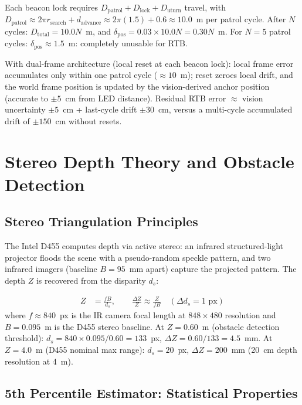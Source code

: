 \begin{eqblock}
Each beacon lock requires $D_{\text{patrol}} + D_{\text{lock}} + D_{\text{uturn}}$ travel, with $D_{\text{patrol}} \approx 2\pi r_{\text{search}} + d_{\text{advance}} \approx 2\pi(1.5) + 0.6 \approx 10.0$~m per patrol cycle. After $N$ cycles: $D_{\text{total}} = 10.0N$~m, and $\delta_{\text{pos}} = 0.03 \times 10.0N = 0.30N$~m. For $N=5$ patrol cycles: $\delta_{\text{pos}} \approx 1.5$~m: completely unusable for RTB.

With dual-frame architecture (local reset at each beacon lock): local frame error accumulates only within one patrol cycle ($\approx10$~m); reset zeroes local drift, and the world frame position is updated by the vision-derived anchor position (accurate to $\pm5$~cm from LED distance). Residual RTB error $\approx$ vision uncertainty $\pm5$~cm + last-cycle drift $\pm30$~cm, versus a multi-cycle accumulated drift of $\pm150$~cm without resets.
\end{eqblock}

\section{Stereo Depth Theory and Obstacle Detection}

\subsection{Stereo Triangulation Principles}

The Intel D455 computes depth via active stereo: an infrared structured-light projector floods the scene with a pseudo-random speckle pattern, and two infrared imagers (baseline $B=95$~mm apart) capture the projected pattern. The depth $Z$ is recovered from the disparity $d_s$:

\begin{eqblock}
\begin{align}
Z &= \frac{fB}{d_s}, \qquad \frac{\Delta Z}{Z} \approx \frac{Z}{fB}\quad(\Delta d_s = 1\text{ px})
\end{align}
where $f\approx840$~px is the IR camera focal length at $848\times480$ resolution and $B=0.095$~m is the D455 stereo baseline. At $Z=0.60$~m (obstacle detection threshold): $d_s = 840\times0.095/0.60 = 133$~px, $\Delta Z = 0.60/133 = 4.5$~mm. At $Z=4.0$~m (D455 nominal max range): $d_s = 20$~px, $\Delta Z = 200$~mm (20~cm depth resolution at 4~m).
\end{eqblock}

\subsection{5th Percentile Estimator: Statistical Properties}

